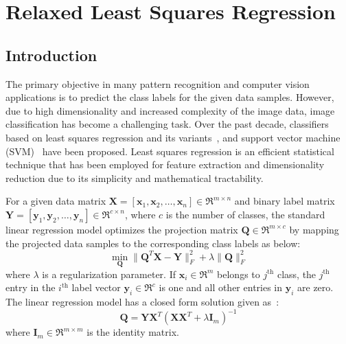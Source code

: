 \chapter{Relaxed Least Squares Regression}
\label{chap:chap6}
%
\section{Introduction}
\label{sec: chap6_intro}
%
The primary objective in many pattern recognition and computer vision applications is to predict the class labels for the given data samples. However, due to high dimensionality and increased complexity of the image data, image classification has become a challenging task. Over the past decade, classifiers based on least squares regression and its variants~\cite{DLSR,ReLSR, GReLSR, ICS_DLSR}, and support vector machine (SVM)~\cite{SVM} have been proposed. Least squares regression is an efficient statistical technique that has been employed for feature extraction and dimensionality reduction due to its simplicity and mathematical tractability. 

For a given data matrix $\mathbf{X} = \left[\mathbf{x}_{1}, \mathbf{x}_{2}, \dots, \mathbf{x}_{n} \right] \in \Re^{m \times n}$ and binary label matrix $\mathbf{Y} = \left[\mathbf{y}_{1}, \mathbf{y}_{2}, \dots, \mathbf{y}_{n} \right]\in \Re^{c \times n}$, where $c$ is the number of classes, the standard linear regression model optimizes the projection matrix $\mathbf{Q} \in \Re^{m \times c}$ by mapping the projected data samples to the corresponding class labels as below:
%
\begin{equation}
    \label{eq: Std_LR}
     \min_{\mathbf{Q}} \| \mathbf{Q}^{T}\mathbf{X} - \mathbf{Y} \|_{F}^{2} + \lambda \| \mathbf{Q}\|_{F}^{2}
\end{equation}
%
where $\lambda$ is a regularization parameter. If $\mathbf{x}_{i} \in \Re^{m}$ belongs to $j^{\text{th}}$ class, the $j^{\text{th}}$ entry in the $i^{\text{th}}$ label vector $\mathbf{y}_{i} \in \Re^{c}$ is one and all other entries in $\mathbf{y}_{i}$ are zero. The linear regression model has a closed form solution given as~\cite{DLSR,ReLSR}:
%
\begin{equation}
    \label{eq: Closed_form_LSR}
    \mathbf{Q} = \mathbf{Y} \mathbf{X}^{T}(\mathbf{X} \mathbf{X}^{T} + \lambda \mathbf{I}_{m})^{-1}
\end{equation}
%
where $\mathbf{I}_{m} \in \Re^{m \times m}$ is the identity matrix. 

